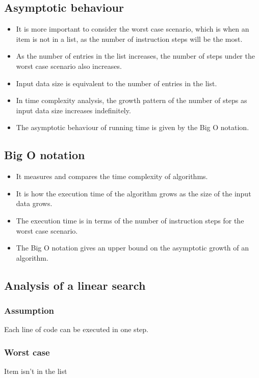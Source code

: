\documentclass[11pt]{article}
\begin{document}
\subsection{Asymptotic behaviour}
\label{sec:orgf9b79be}
\begin{itemize}
\item It is more important to consider the worst case scenario, which is when an item is not in a list, as the number of instruction steps will be the most.
\item As the number of entries in the list increases, the number of steps under the worst case scenario also increases.
\item Input data size is equivalent to the number of entries in the list.
\item In time complexity analysis, the growth pattern of the number of steps as input data size increases indefinitely.
\item The asymptotic behaviour of running time is given by the Big O notation.
\end{itemize}

\subsection{Big O notation}
\label{sec:orgbc9d8a0}
\begin{itemize}
\item It measures and compares the time complexity of algorithms.
\item It is how the execution time of the algorithm grows as the size of the input data grows.
\item The execution time is in terms of the number of instruction steps for the worst case scenario.
\item The Big O notation gives an upper bound on the asymptotic growth of an algorithm.
\end{itemize}

\subsection{Analysis of a linear search}
\label{sec:org74d188b}

\subsubsection{Assumption}
\label{sec:org7e68aa6}
Each line of code can be executed in one step.

\subsubsection{Worst case}
\label{sec:org6de01f3}
Item isn't in the list
\end{document}
